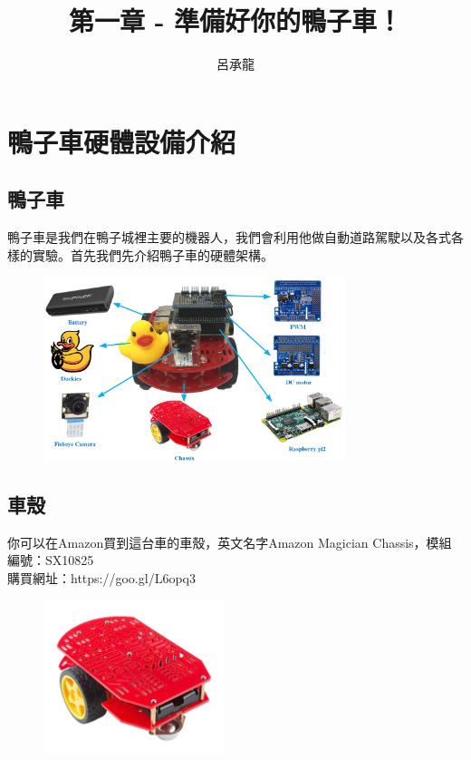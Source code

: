 \documentclass{article}
\title{第一章 - 準備好你的鴨子車！}
\author{呂承龍}
\date{} %
\begin{document}
\maketitle

\section{鴨子車硬體設備介紹}
\subsection{鴨子車}
鴨子車是我們在鴨子城裡主要的機器人，我們會利用他做自動道路駕駛以及各式各樣的實驗。首先我們先介紹鴨子車的硬體架構。
\\
\begin{figure}[htp]
    \begin{center}
        \includegraphics[width=250pt]{pic/1_1_1.png}
    \end{center}
\end{figure}

\subsection{車殼}
你可以在Amazon買到這台車的車殼，英文名字Amazon Magician Chassis，模組編號：SX10825
\\購買網址：https://goo.gl/L6opq3
\\
\begin{figure}[htp]
    \begin{center}
        \includegraphics[width=150pt]{pic/1_1_23.png}
    \end{center}
\end{figure}
\end{document}
